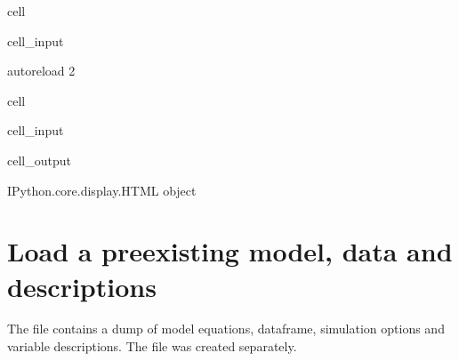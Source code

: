 \documentclass[letterpaper,10pt,english]{jupyterBook}
\begin{document}
\begin{sphinxuseclass}{cell}\begin{sphinxVerbatimInput}

\begin{sphinxuseclass}{cell_input}
\begin{sphinxVerbatim}[commandchars=\\\{\}]
  autoreload
  2
\end{sphinxVerbatim}

\end{sphinxuseclass}\end{sphinxVerbatimInput}

\end{sphinxuseclass}
\begin{sphinxuseclass}{cell}\begin{sphinxVerbatimInput}

\begin{sphinxuseclass}{cell_input}
\begin{sphinxVerbatim}[commandchars=\\\{\}]
   
    
   
\end{sphinxVerbatim}

\end{sphinxuseclass}\end{sphinxVerbatimInput}
\begin{sphinxVerbatimOutput}

\begin{sphinxuseclass}{cell_output}
\begin{sphinxVerbatim}[commandchars=\\\{\}]
\PYGZlt{}IPython.core.display.HTML object\PYGZgt{}
\end{sphinxVerbatim}

\end{sphinxuseclass}\end{sphinxVerbatimOutput}

\end{sphinxuseclass}

\section{Load a pre\sphinxhyphen{}existing model, data and descriptions}
\label{\detokenize{content/howto/fixing/Fixing variables:load-a-pre-existing-model-data-and-descriptions}}
\sphinxAtStartPar
The file  contains a dump of model equations, dataframe, simulation options and variable descriptions. The file was created separately.
\end{document}
